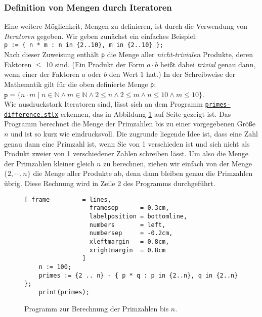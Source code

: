 \subsubsection{Definition von Mengen durch Iteratoren}
Eine weitere Möglichkeit, Mengen zu definieren, ist durch die Verwendung von
\emph{Iteratoren} gegeben.  Wir geben zunächst ein einfaches Beispiel: 
\\[0.2cm]
\hspace*{1.3cm} 
\texttt{p := \{ n * m : n in \{2..10\}, m in \{2..10\} \};} 
\\[0.2cm]
Nach dieser Zuweisung enthält \texttt{p} die Menge aller \emph{nicht-trivialen} Produkte, deren
Faktoren $\leq$ 10 sind.  (Ein Produkt der Form $a \cdot b$ heißt dabei \emph{trivial} genau
dann, wenn einer der Faktoren $a$ oder $b$ den Wert $1$ hat.)
In der Schreibweise der Mathematik  gilt für die oben definierte Menge \texttt{p}: 
\\[0.2cm]
\hspace*{1.3cm} 
$\mathtt{p} = \bigl\{ n \cdot m \mid n \in \mathbb{N} \wedge m \in \mathbb{N} \wedge 
                                 2 \leq n \wedge 2 \leq m \wedge n \leq 10 \wedge m \leq 10 
              \bigl\}
$. 
\\[0.2cm]
Wie ausdruckstark Iteratoren sind, lässt sich an dem Programm 
\href{https://github.com/karlstroetmann/Logik/blob/master/SetlX/primes-difference.stlx}{\texttt{primes-difference.stlx}}
erkennen, das in Abbildung \ref{fig:primes-sieve.stlx} auf Seite \pageref{fig:primes-sieve.stlx}
gezeigt ist.  Das Programm berechnet die Menge der Primzahlen bis zu einer
vorgegebenen Größe $n$ und ist so kurz wie eindrucksvoll.  Die zugrunde liegende
Idee ist, dass eine Zahl genau dann eine Primzahl ist, wenn Sie von 1
verschieden ist und sich nicht als Produkt zweier von 1 verschiedener Zahlen
schreiben lässt.  Um also die Menge der Primzahlen kleiner gleich $n$ zu
berechnen, ziehen wir einfach von der Menge  $\{ 2, \cdots, n \}$ die Menge aller Produkte
ab, denn dann bleiben genau die Primzahlen übrig.   Diese Rechnung wird in Zeile 2 des Programms
durchgeführt.  


\begin{figure}[!ht]
  \centering
\begin{Verbatim}[ frame         = lines, 
                  framesep      = 0.3cm, 
                  labelposition = bottomline,
                  numbers       = left,
                  numbersep     = -0.2cm,
                  xleftmargin   = 0.8cm,
                  xrightmargin  = 0.8cm
                ]
    n := 100;
    primes := {2 .. n} - { p * q : p in {2..n}, q in {2..n} };
    print(primes);
\end{Verbatim} 
\vspace*{-0.3cm}
\caption{Programm zur Berechnung der Primzahlen bis $n$.}
  \label{fig:primes-sieve.stlx}
\end{figure} %


